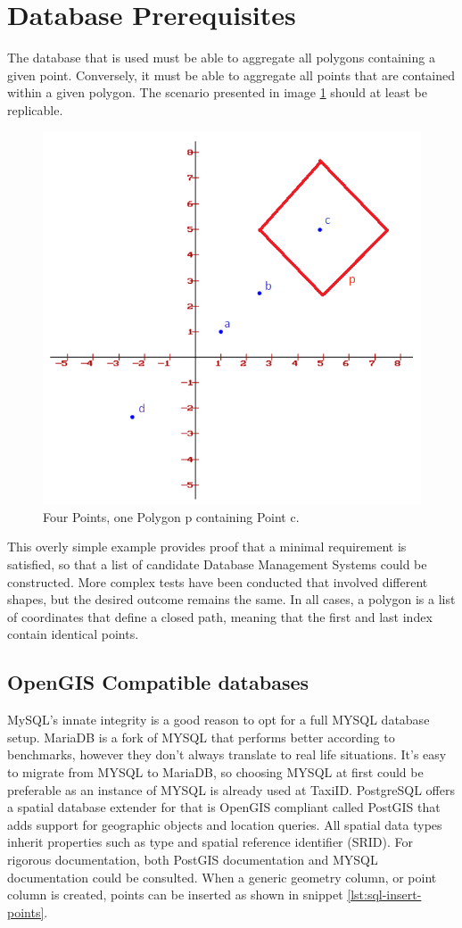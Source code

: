 %
\section{Database Prerequisites}
The database that is used must be able to aggregate all polygons containing a given point. Conversely, it must be able to aggregate all points that are contained within a given polygon. The scenario presented in image \ref{fig:square} should at least be replicable.

\begin{figure}[htbp!]
	\centering
	\includegraphics[width=.5\textwidth]{Square}
	\caption[Square Containing One Point]{Four Points, one Polygon p containing Point c.}
	\label{fig:square}
\end{figure}

This overly simple example provides proof that a minimal requirement is satisfied, so that a list of candidate Database Management Systems could be constructed. More complex tests have been conducted that involved different shapes, but the desired outcome remains the same. In all cases, a polygon is a list of coordinates that define a closed path, meaning that the first and last index contain identical points.

\subsection{OpenGIS Compatible databases}
MySQL's innate integrity is a good reason to opt for a full MYSQL database setup. MariaDB is a fork of MYSQL that performs better according to benchmarks, however they don’t always translate to real life situations. It’s easy to migrate from MYSQL to MariaDB, so choosing MYSQL at first could be preferable as an instance of MYSQL is already used at TaxiID. PostgreSQL offers a spatial database extender for that is OpenGIS compliant called PostGIS that adds support for geographic objects and location queries. All spatial data types inherit properties such as type and spatial reference identifier (SRID). For rigorous documentation, both PostGIS documentation \cite{PostGIS} and MYSQL documentation \cite{MySQL} could be consulted. When a generic geometry column, or point column is created, points can be inserted as shown in snippet \ref{lst:sql-insert-points}.

